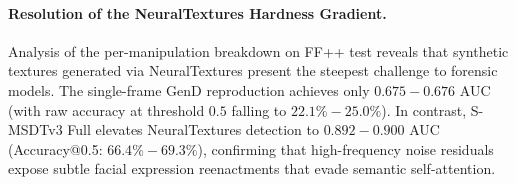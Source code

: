 \paragraph{Resolution of the NeuralTextures Hardness Gradient.}
Analysis of the per-manipulation breakdown on FF++ test reveals that synthetic textures generated via NeuralTextures present the steepest challenge to forensic models. The single-frame GenD reproduction achieves only $0.675 - 0.676$ AUC (with raw accuracy at threshold $0.5$ falling to $22.1\% - 25.0\%$). In contrast, S-MSDTv3 Full elevates NeuralTextures detection to $\mathbf{0.892 - 0.900}$ AUC (Accuracy@0.5: $66.4\% - 69.3\%$), confirming that high-frequency noise residuals expose subtle facial expression reenactments that evade semantic self-attention.

